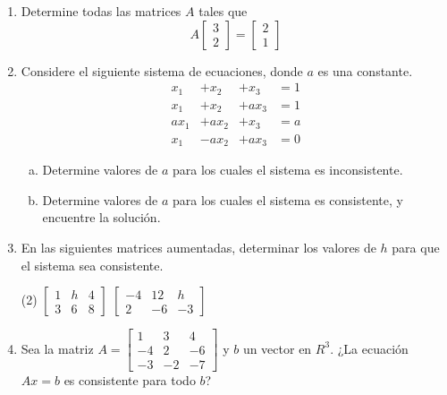 \documentclass[12pt]{article}
\newenvironment{preguntas}
{\begin{enumerate}\itemsep12pt
	}
	{
	\end{enumerate}
}
\begin{document}
\begin{preguntas}
\begin{enumerate}[a)]
\item Describir todas las soluciones de $Ax=b$ con $b=
		\begin{pmatrix}
		7\\
		-1\\
		-4
		\end{pmatrix}$ 
\end{enumerate}
\item Determine todas las matrices $A$ tales que
	$$ A\begin{bmatrix}
	3\\
	2
	\end{bmatrix}=\begin{bmatrix}
	2\\
	1
	\end{bmatrix}$$
\item Considere el siguiente sistema de ecuaciones, donde $a$ es una constante.
  $$\begin{array}{llll}
   x_1&+x_2&+x_3&=1 \\
    x_1&+x_2&+ax_3&=1 \\
     ax_1&+ax_2&+x_3&=a\\
      x_1&-ax_2&+ax_3&=0  
  \end{array}$$
\begin{enumerate}[a)]
\item Determine valores de $a$ para los cuales el sistema es inconsistente.
\item Determine valores de $a$ para los cuales el sistema es consistente, y encuentre la solución.
\end{enumerate}
\item En las siguientes matrices aumentadas, determinar los valores de $h$ para que el sistema sea consistente.
\begin{tasks}(2)
\task $
		\begin{bmatrix}
		1 & h & 4\\
		3 & 6 & 8
		\end{bmatrix}
		$
\task $
		\begin{bmatrix}
		-4 & 12 & h\\
		2 & -6 & -3
		\end{bmatrix}
		$
\end{tasks}
\item Sea la matriz $A=
	\begin{bmatrix}
	1 & 3 & 4\\
	-4 & 2 & -6\\
	-3 & -2 & -7
	\end{bmatrix}
	$ y $b$ un vector en $R^3$. ¿La ecuación $Ax=b$ es consistente para todo $b$?

\end{preguntas}
\end{document}
